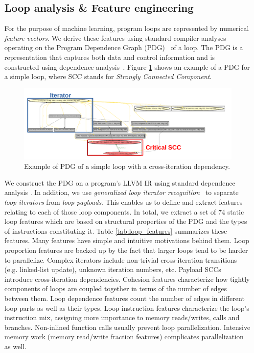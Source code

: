 \subsection{Loop analysis \& Feature engineering}
\label{loop_analysis_and_features}
\quad For the purpose of machine learning, program loops are represented by numerical \textit{feature vectors}. We derive these features using standard compiler analyses operating on the Program Dependence Graph (PDG)~\cite{Ferrante:1987:PDG:24039.24041} of a loop. The PDG is a representation that captures both data and control information and is constructed using dependence analysis~\cite{Kennedy:2001:OCM:502981}. Figure \ref{fig:pdg} shows an example of a PDG for a simple loop, where SCC stands for \emph{Strongly Connected Component}.
\begin{figure}[ht]
\includegraphics[width=1.0\textwidth]{images/pdg_example.pdf}
\caption{Example of PDG of a simple loop with a cross-iteration dependency.}
\label{fig:pdg}
\end{figure}
We construct the PDG on a program's LLVM IR using standard dependence analysis \cite{Kennedy:2001:OCM:502981}. In addition, we use \textit{generalized loop iterator recognition}~\cite{Manilov:2018:GPI:3178372.3179511} to separate \textit{loop iterators} from \textit{loop payloads}. This enables us to define and extract features relating to each of those loop components. In total, we extract a set of 74 static loop features which are based on structural properties of the PDG and the types of instructions constituting it. Table \ref{tab:loop_features} summarizes these features.\newline\null
\quad Many features have simple and intuitive motivations behind them. Loop proportion features are backed up by the fact that larger loops tend to be harder to parallelize. Complex iterators include non-trivial cross-iteration transitions (e.g. linked-list update), unknown iteration numbers, etc. Payload SCCs introduce cross-iteration dependencies. Cohesion features characterize how tightly components of loops are coupled together in terms of the number of edges between them. Loop dependence features count the number of edges in different loop parts as well as their types. Loop instruction features characterize the loop's instruction mix, assigning more importance to memory reads/writes, calls and branches. Non-inlined function calls usually prevent loop parallelization. Intensive memory work (memory read/write fraction features) complicates parallelization as well.

